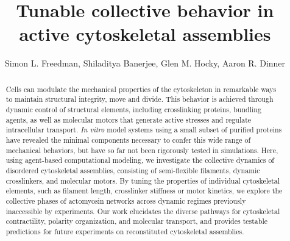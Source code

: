 \documentclass[11pt]{article}
\begin{document}
\title{{\color{blue}Tunable} collective behavior in active cytoskeletal assemblies}
\author{Simon L. Freedman, Shiladitya Banerjee, Glen M. Hocky, Aaron R. Dinner}
\date{}
\maketitle
\begin{abstract}
Cells {\color{red}can} modulate the mechanical properties of the cytoskeleton in remarkable ways to maintain structural integrity, move and divide. This behavior is achieved through {\color{red}dynamic} control of structural elements, including crosslinking proteins, {\color{red}bundling agents}, as well as {\color{red}molecular} motors that generate {\color{red}active} stresses and {\color{red}regulate intracellular} transport. {\em In vitro} {\color{red}model systems} using a small subset of {\color{red}purified} proteins have {\color{red}revealed the minimal} components necessary to confer this wide range of {\color{red}mechanical} behaviors, {\color{red}but have so far not been rigorously tested in simulations}. {\color{red}Here, using agent-based computational modeling, we investigate the collective dynamics of disordered cytoskeletal assemblies}, consisting of semi-flexible {\color{red}filaments}, dynamic crosslinkers, and molecular motors. {\color{red}By tuning the properties of individual cytoskeletal elements}, such as filament length, crosslinker stiffness or motor kinetics, {\color{red}we explore the collective phases of actomyosin networks across dynamic regimes previously inaccessible by experiments. Our work elucidates the diverse pathways for cytoskeletal contractility, polarity organization, and molecular transport, and provides testable predictions for future experiments on reconstituted cytoskeletal assemblies}. 
\end{abstract}
\end{document}
